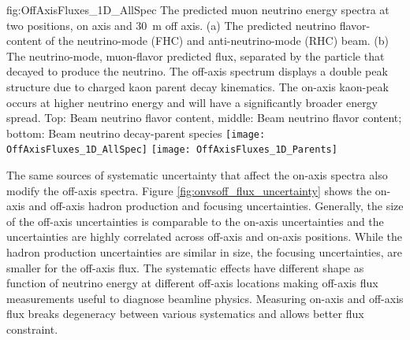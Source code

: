 \begin{dunefigure}{fig:OffAxisFluxes_1D_AllSpec}
{The predicted muon neutrino energy spectra at two  positions, on axis and \SI{30}{m} off axis. (a) The predicted neutrino flavor-content of the neutrino-mode (FHC) and anti-neutrino-mode (RHC) beam. (b) The neutrino-mode, muon-flavor predicted flux, separated by the particle that decayed to produce the neutrino. The off-axis spectrum displays a double peak structure due to charged kaon parent decay kinematics. The on-axis kaon-peak occurs at higher neutrino energy and will have a significantly broader energy spread. Top: Beam neutrino flavor content, middle: Beam neutrino flavor content; bottom: Beam neutrino decay-parent species}
    \texttt{[image: OffAxisFluxes\_1D\_AllSpec]}
  \texttt{[image: OffAxisFluxes\_1D\_Parents]}    
    \end{dunefigure}


The same sources of systematic uncertainty that affect the on-axis spectra also modify the off-axis spectra. 
Figure \ref{fig:onvsoff_flux_uncertainty} shows the on-axis and off-axis hadron production and focusing uncertainties. 
Generally, the size of the off-axis uncertainties is comparable to the on-axis uncertainties and the uncertainties are highly correlated across off-axis and on-axis positions. While the hadron production uncertainties are similar in size, the focusing uncertainties, are smaller for the off-axis flux. The systematic effects have different shape as function of neutrino energy at different off-axis locations making off-axis flux measurements useful to diagnose beamline physics. Measuring on-axis and off-axis flux breaks degeneracy between various systematics and allows better flux constraint.


